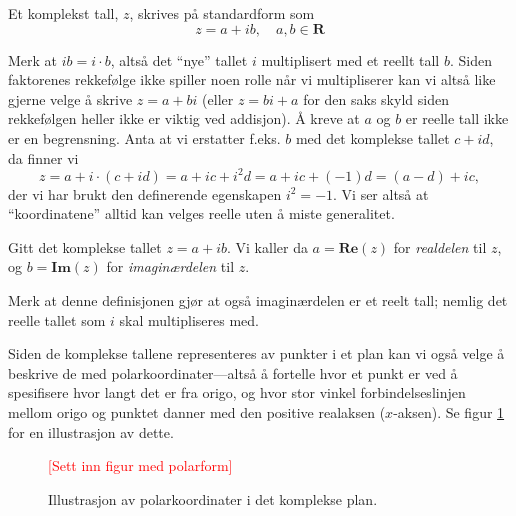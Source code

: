 \documentclass[a4paper,norsk,12pt]{article}
\begin{document}
\begin{tdef}
Et komplekst tall, $z$, skrives på standardform som
\begin{displaymath}
	z = a + ib, \quad a,b\in\mathbf{R}
\end{displaymath}
\end{tdef}
\noindent
Merk at $ib = i\cdot b$, altså det ``nye'' tallet $i$ multiplisert med et reellt tall $b$. Siden faktorenes rekkefølge ikke spiller noen rolle når vi multipliserer kan vi altså like gjerne velge å skrive $z=a+bi$ (eller $z= bi + a$ for den saks skyld siden rekkefølgen heller ikke er viktig ved addisjon). Å kreve at $a$ og $b$ er reelle tall ikke er en begrensning. Anta at vi erstatter f.eks. $b$ med det komplekse tallet $c+id$, da finner vi
\begin{displaymath}
	z = a + i\cdot(c+id) = a+ ic + i^2d = a + ic +(-1)d = (a-d)+ic,
\end{displaymath}
der vi har brukt den definerende egenskapen $i^2=-1$. Vi ser altså at ``koordinatene'' alltid kan velges reelle uten å miste generalitet. 
\begin{tdef}
	Gitt det komplekse tallet $z = a+ib$. Vi kaller da $a = \mathbf{Re}(z)$ for \emph{realdelen} til $z$, og $b=\mathbf{Im}(z)$ for \emph{imaginærdelen} til $z$.
\end{tdef}
\noindent
Merk at denne definisjonen gjør at også imaginærdelen er et reelt tall; nemlig det reelle tallet som $i$ skal multipliseres med.

Siden de komplekse tallene representeres av punkter i et plan kan vi også velge å beskrive de med polarkoordinater---altså å fortelle hvor et punkt er ved å spesifisere hvor langt det er fra origo, og hvor stor vinkel forbindelseslinjen mellom origo og punktet danner med den positive realaksen ($x$-aksen). Se figur \ref{kompleks:fig:polar} for en illustrasjon av dette. 

\begin{figure}[htp]
	\begin{center}
	\textcolor{red}{[Sett inn figur med polarform]}
	\end{center}
	\caption{Illustrasjon av polarkoordinater i det komplekse plan.}
	\label{kompleks:fig:polar}
\end{figure}
\end{document}
